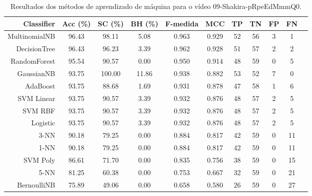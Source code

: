 \begin{table}[!htb]
\centering
\caption{Resultados dos métodos de aprendizado de máquina para o vídeo 09-Shakira-pRpeEdMmmQ0.}
\label{tab:09-Shakira-pRpeEdMmmQ0}
\begin{tabular}{r|c|c|c|c|c|c|c|c|c|c}
\hline\hline
Classifier & Acc (\%) & SC (\%) & BH (\%) & F-medida & MCC & TP & TN & FP & FN \\ \hline
MultinomialNB & 96.43 & 98.11 & 5.08 & 0.963 & 0.929 & 52 & 56 & 3 & 1 \\ 
DecisionTree & 96.43 & 96.23 & 3.39 & 0.962 & 0.928 & 51 & 57 & 2 & 2 \\ 
RandomForest & 95.54 & 90.57 & 0.00 & 0.950 & 0.914 & 48 & 59 & 0 & 5 \\ 
GaussianNB & 93.75 & 100.00 & 11.86 & 0.938 & 0.882 & 53 & 52 & 7 & 0 \\ 
AdaBoost & 93.75 & 88.68 & 1.69 & 0.931 & 0.878 & 47 & 58 & 1 & 6 \\ 
SVM Linear & 93.75 & 90.57 & 3.39 & 0.932 & 0.876 & 48 & 57 & 2 & 5 \\ 
SVM RBF & 93.75 & 90.57 & 3.39 & 0.932 & 0.876 & 48 & 57 & 2 & 5 \\ 
Logistic & 93.75 & 90.57 & 3.39 & 0.932 & 0.876 & 48 & 57 & 2 & 5 \\ 
3-NN & 90.18 & 79.25 & 0.00 & 0.884 & 0.817 & 42 & 59 & 0 & 11 \\ 
1-NN & 90.18 & 79.25 & 0.00 & 0.884 & 0.817 & 42 & 59 & 0 & 11 \\ 
SVM Poly & 86.61 & 71.70 & 0.00 & 0.835 & 0.756 & 38 & 59 & 0 & 15 \\ 
5-NN & 81.25 & 60.38 & 0.00 & 0.753 & 0.667 & 32 & 59 & 0 & 21 \\ 
BernoulliNB & 75.89 & 49.06 & 0.00 & 0.658 & 0.580 & 26 & 59 & 0 & 27 \\ 
\hline\hline
\end{tabular}
\end{table}
